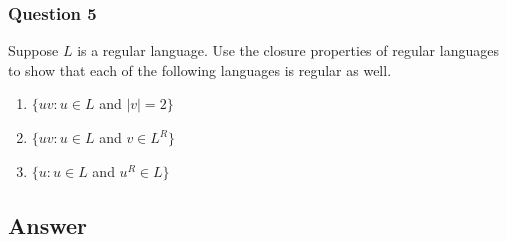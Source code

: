 \newpage
\subsubsection*{Question 5}
\noindent[15 pts] Suppose $L$ is a regular language. Use the closure properties of regular languages
to show that each of the following languages is regular as well.
\begin{enumerate}[label={(\alph*)}]
    \item $\{uv : u \in L$ and $|v| = 2 \}$
    \item $\{ uv : u \in L$ and $v \in L^R \}$
    \item $\{ u : u \in L$ and $u^R \in L\}$
\end{enumerate}

\subsection*{Answer}
